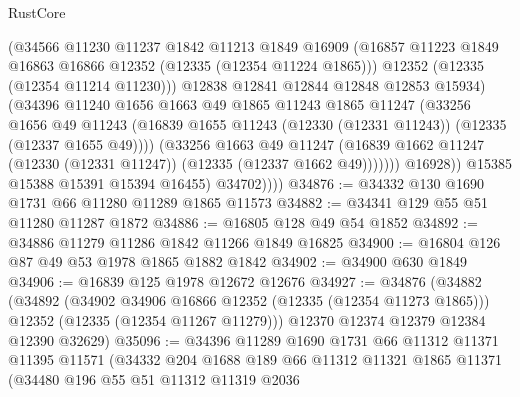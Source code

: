 \begin{lexlean}{RustCore}
\begin{coremodule}
                        (@34566
                          @11230
                          @11237
                          @1842
                          @11213
                          @1849
                          @16909
                          (@16857 @11223 @1849 @16863 @16866 @12352 (@12335 (@12354 @11224 @1865)))
                          @12352
                          (@12335 (@12354 @11214 @11230)))
                        @12838
                        @12841
                        @12844
                        @12848
                        @12853
                        @15934)
                      (@34396
                        @11240
                        @1656
                        @1663
                        @49
                        @1865
                        @11243
                        @1865
                        @11247
                        (@33256
                          @1656
                          @49
                          @11243
                          (@16839
                            @1655
                            @11243
                            (@12330 (@12331 @11243))
                            (@12335 (@12337 @1655 @49))))
                        (@33256
                          @1663
                          @49
                          @11247
                          (@16839
                            @1662
                            @11247
                            (@12330 (@12331 @11247))
                            (@12335 (@12337 @1662 @49)))))))
                  @16928))
              @15385
              @15388
              @15391
              @15394
              @16455)
            @34702))))
@34876 := @34332 @130 @1690 @1731 @66 @11280 @11289 @1865 @11573
@34882 := @34341 @129 @55 @51 @11280 @11287 @1872
@34886 := @16805 @128 @49 @54 @1852
@34892 := @34886 @11279 @11286 @1842 @11266 @1849 @16825
@34900 := @16804 @126 @87 @49 @53 @1978 @1865 @1882 @1842
@34902 := @34900 @630 @1849
@34906 := @16839 @125 @1978 @12672 @12676
@34927 := @34876
    (@34882
      (@34892
        (@34902 @34906 @16866 @12352 (@12335 (@12354 @11273 @1865)))
        @12352
        (@12335 (@12354 @11267 @11279)))
      @12370
      @12374
      @12379
      @12384
      @12390
      @32629)
@35096 := @34396
    @11289
    @1690
    @1731
    @66
    @11312
    @11371
    @11395
    @11571
    (@34332
      @204
      @1688
      @189
      @66
      @11312
      @11321
      @1865
      @11371
      (@34480
        @196
        @55
        @51
        @11312
        @11319
        @2036

\end{coremodule}
\end{lexlean}
